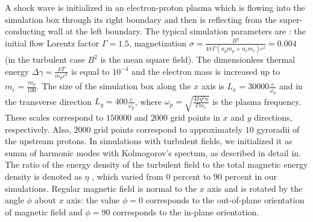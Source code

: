 \documentclass[a4paper]{jpconf}
\begin{document}
	A shock wave is initialized in an electron-proton plasma which is flowing into the simulation box through its right boundary and then is reflecting from the super-conducting wall at the left boundary.  The typical simulation parameters are : the initial flow Lorentz factor $\Gamma = 1.5$, magnetization $\sigma = \frac{B^2}{4\pi\Gamma (n_p m_p + n_e m_e) c^2} = 0.004$ (in the turbulent case $B^2$ is the mean square field). The dimensionless thermal energy $\Delta \gamma = \frac{k T}{m_p c^2}$ is equal to $10^{-4}$ and the electron mass is increased up to $m_e = \frac{m_p}{100}$. The size of the simulation box along the $x$ axis is $L_x = 30000\frac{c}{\omega_p}$ and in the transverse direction $L_y = 400\frac{c}{\omega_p}$, where $\omega_p = \sqrt{\frac{4\pi q^2 n}{\Gamma m_e}}$ is the plasma frequency. These scales correspond to $150000$ and $2000$ grid points in $x$ and $y$ directions, respectively. Also, $2000$ grid points correspond to approximately $10$ gyroradii of the upstream protons.
	In simulations with turbulent fields, we initialized it as  summ of harmonic modes with Kolmogorov's spectum, as described in detail in\cite{Romansky2019}. The ratio of the energy density of the turbulent field to the total magnetic energy density is denoted as $\eta$ , which varied from 0 percent to 90 percent in our simulations. Regular magnetic field is normal to the $x$ axis and is rotated by the angle $\phi$ about $x$ axis: the value $\phi = 0$ corresponds to the out-of-plane orientation of magnetic field and $\phi = 90$ corresponds to the in-plane orientation.
	
	
	
\end{document}
